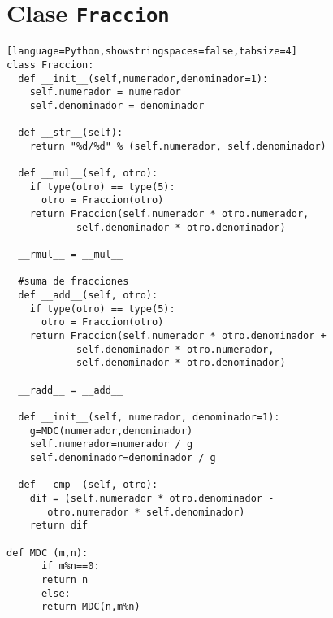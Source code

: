 \section{Clase \texttt{Fraccion}}

\texttt{}
\begin{verbatim}[language=Python,showstringspaces=false,tabsize=4]
class Fraccion:
  def __init__(self,numerador,denominador=1):
    self.numerador = numerador
    self.denominador = denominador

  def __str__(self):
    return "%d/%d" % (self.numerador, self.denominador)
  
  def __mul__(self, otro):
    if type(otro) == type(5):
      otro = Fraccion(otro)
    return Fraccion(self.numerador * otro.numerador,
		    self.denominador * otro.denominador)
  
  __rmul__ = __mul__ 

  #suma de fracciones
  def __add__(self, otro):
    if type(otro) == type(5):
      otro = Fraccion(otro)
    return Fraccion(self.numerador * otro.denominador +
		    self.denominador * otro.numerador,
		    self.denominador * otro.denominador)
  
  __radd__ = __add__
  
  def __init__(self, numerador, denominador=1):      
    g=MDC(numerador,denominador)
    self.numerador=numerador / g
    self.denominador=denominador / g
  
  def __cmp__(self, otro):
    dif = (self.numerador * otro.denominador -
	   otro.numerador * self.denominador)
    return dif

def MDC (m,n):
      if m%n==0:
	  return n
      else:
	  return MDC(n,m%n)
\end{verbatim}

